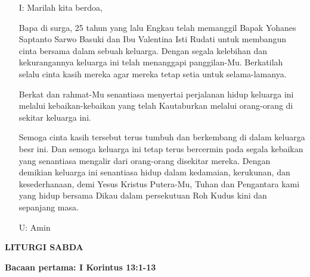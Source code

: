 \documentclass[12pt,two pages]{scrbook}
\makeatletter
\newcommand{\judul}[1]{%
  {\parindent \z@ \centering \normalfont
    \interlinepenalty\@M \Large \bfseries #1\par\nobreak \vskip 20\p@ }}
\newcommand{\subjudul}[1]{%
  {\parindent \z@ \normalfont
    \interlinepenalty\@M \bfseries #1\par\nobreak \vskip 20\p@ }}
\newcommand{\BU}[1]{\begin{itemize} \item[U:] #1 \end{itemize}}
\newcommand{\BI}[1]{\begin{itemize} \item[I:] #1 \end{itemize}}
\newcommand{\ultah}{25 }
\newcommand{\suami}{Yohanes Saptanto Sarwo Basuki }
\newcommand{\istri}{Valentina Isti Rudati }
\makeatother
\begin{document}
\BI{Marilah kita berdoa,

Bapa di surga, \ultah tahun yang lalu Engkau telah memanggil Bapak \suami dan Ibu \istri untuk membangun cinta bersama dalam sebuah keluarga. Dengan segala kelebihan dan kekurangannya keluarga ini telah menanggapi panggilan-Mu. Berkatilah selalu cinta kasih mereka agar mereka tetap setia untuk selama-lamanya.

Berkat dan rahmat-Mu senantiasa menyertai perjalanan hidup keluarga ini melalui kebaikan-kebaikan yang telah Kautaburkan melalui orang-orang di sekitar keluarga ini.

Semoga cinta kasih tersebut terus tumbuh dan berkembang di dalam keluarga besr ini. Dan semoga keluarga ini tetap terus bercermin pada segala kebaikan yang senantiasa mengalir dari orang-orang disekitar mereka. Dengan demikian keluarga ini senantiasa hidup dalam kedamaian, kerukunan, dan kesederhanaan, demi Yesus Kristus Putera-Mu, Tuhan dan Pengantara kami yang hidup bersama Dikau dalam persekutuan Roh Kudus kini dan sepanjang masa.}

\BU{Amin}

\judul{LITURGI SABDA}

\subjudul{Bacaan pertama: I Korintus 13:1-13}
\end{document}
